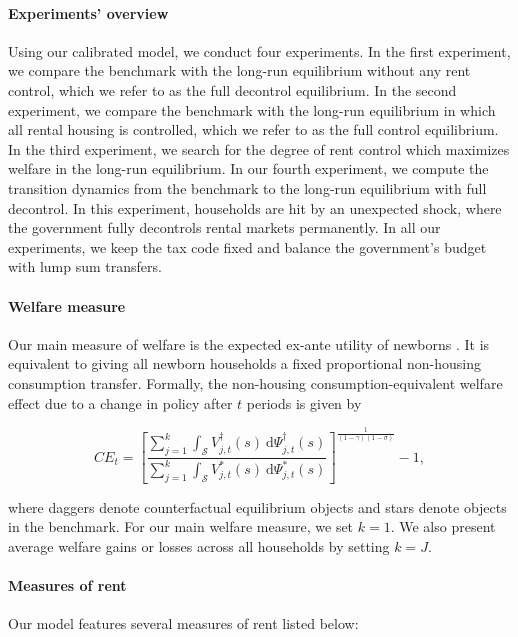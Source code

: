 \documentclass[parskip=full]{article}
\begin{document}
\paragraph{Experiments' overview} Using our calibrated model, we conduct four experiments. In the first experiment, we compare the benchmark with the long-run equilibrium without any rent control, which we refer to as the full decontrol equilibrium. In the second experiment, we compare the benchmark with the long-run equilibrium in which all rental housing is controlled, which we refer to as the full control equilibrium. In the third experiment, we search for the degree of rent control which maximizes welfare in the long-run equilibrium. In our fourth experiment, we compute the transition dynamics from the benchmark to the long-run equilibrium with full decontrol. In this experiment, households are hit by an unexpected shock, where the government fully decontrols rental markets permanently. In all our experiments, we keep the tax code fixed and balance the government's budget with lump sum transfers. 

\paragraph{Welfare measure} Our main measure of welfare is the expected ex-ante utility of newborns \citep{ralws-1971,conesa-et-al,gkkoc}. It is equivalent to giving all newborn households a fixed proportional non-housing consumption transfer. Formally, the non-housing consumption-equivalent welfare effect due to a change in policy after $t$ periods is given by

\begin{equation*}
  CE_{t} = \left[\frac{\sum_{j=1}^{k}\int_{\mathcal{S}}V^{\dagger}_{j,t}(s)\ \mathrm{d}\Psi^{\dagger}_{j,t}(s)}{\sum_{j=1}^{k}\int_{\mathcal{S}}V^*_{j,t}(s)\ \mathrm{d}\Psi^*_{j,t}(s)}\right]^{\frac{1}{(1-\gamma)(1-\sigma)}}-1,
\end{equation*}

\noindent where daggers denote counterfactual equilibrium objects and stars denote objects in the benchmark. For our main welfare measure, we set $k=1$. We also present average welfare gains or losses across all households by setting $k=J$.

\paragraph{Measures of rent} Our model features several measures of rent listed below: 
\end{document}
